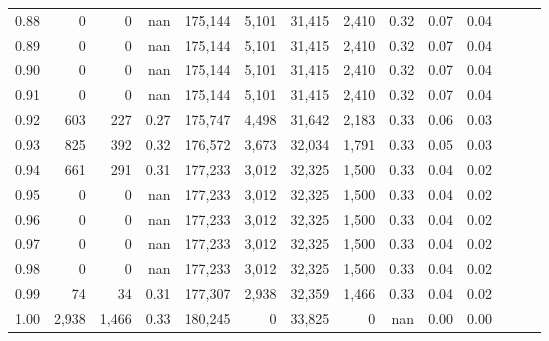 \begin{tabular}{rrrrrrrrrrrrrr}
0.88 &       0 &      0 &   nan &  175,144 &    5,101 &  31,415 &   2,410 &  0.32 &  0.07 &      0.04 \\
0.89 &       0 &      0 &   nan &  175,144 &    5,101 &  31,415 &   2,410 &  0.32 &  0.07 &      0.04 \\
0.90 &       0 &      0 &   nan &  175,144 &    5,101 &  31,415 &   2,410 &  0.32 &  0.07 &      0.04 \\
0.91 &       0 &      0 &   nan &  175,144 &    5,101 &  31,415 &   2,410 &  0.32 &  0.07 &      0.04 \\
0.92 &     603 &    227 &  0.27 &  175,747 &    4,498 &  31,642 &   2,183 &  0.33 &  0.06 &      0.03 \\
0.93 &     825 &    392 &  0.32 &  176,572 &    3,673 &  32,034 &   1,791 &  0.33 &  0.05 &      0.03 \\
0.94 &     661 &    291 &  0.31 &  177,233 &    3,012 &  32,325 &   1,500 &  0.33 &  0.04 &      0.02 \\
0.95 &       0 &      0 &   nan &  177,233 &    3,012 &  32,325 &   1,500 &  0.33 &  0.04 &      0.02 \\
0.96 &       0 &      0 &   nan &  177,233 &    3,012 &  32,325 &   1,500 &  0.33 &  0.04 &      0.02 \\
0.97 &       0 &      0 &   nan &  177,233 &    3,012 &  32,325 &   1,500 &  0.33 &  0.04 &      0.02 \\
0.98 &       0 &      0 &   nan &  177,233 &    3,012 &  32,325 &   1,500 &  0.33 &  0.04 &      0.02 \\
0.99 &      74 &     34 &  0.31 &  177,307 &    2,938 &  32,359 &   1,466 &  0.33 &  0.04 &      0.02 \\
1.00 &   2,938 &  1,466 &  0.33 &  180,245 &        0 &  33,825 &       0 &   nan &  0.00 &      0.00 \\
\bottomrule
\end{tabular}
